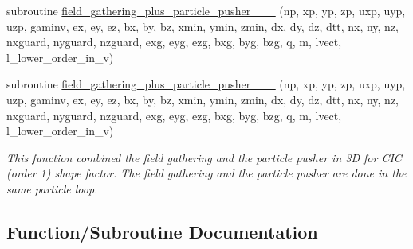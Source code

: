 \begin{DoxyCompactItemize}
subroutine \hyperlink{particles__push_8_f90_ac04a46dfecd1ade015d3bf1ff801159a}{field\+\_\+gathering\+\_\+plus\+\_\+particle\+\_\+pusher\+\_\+\_\+\_} (np, xp, yp, zp, uxp, uyp, uzp, gaminv,                                                                                                                                                   ex, ey, ez, bx, by, bz, xmin, ymin, zmin,                                                                                                                                                           dx, dy, dz, dtt, nx, ny, nz, nxguard, nyguard, nzguard,                                                                                                                                                   exg, eyg, ezg, bxg, byg, bzg, q, m, lvect, l\+\_\+lower\+\_\+order\+\_\+in\+\_\+v)
\item 
subroutine \hyperlink{particles__push_8_f90_a87ad05cb46ac948188f2738ca82ab6a3}{field\+\_\+gathering\+\_\+plus\+\_\+particle\+\_\+pusher\+\_\+\_\+\_} (np, xp, yp, zp, uxp, uyp, uzp, gaminv,                                                                                                                                                   ex, ey, ez, bx, by, bz, xmin, ymin, zmin,                                                                                                                                                           dx, dy, dz, dtt, nx, ny, nz, nxguard, nyguard, nzguard,                                                                                                                                                   exg, eyg, ezg, bxg, byg, bzg, q, m, lvect, l\+\_\+lower\+\_\+order\+\_\+in\+\_\+v)
\begin{DoxyCompactList}\small\item\em This function combined the field gathering and the particle pusher in 3D for C\+IC (order 1) shape factor. The field gathering and the particle pusher are done in the same particle loop. \end{DoxyCompactList}\end{DoxyCompactItemize}


\subsection{Function/\+Subroutine Documentation}
